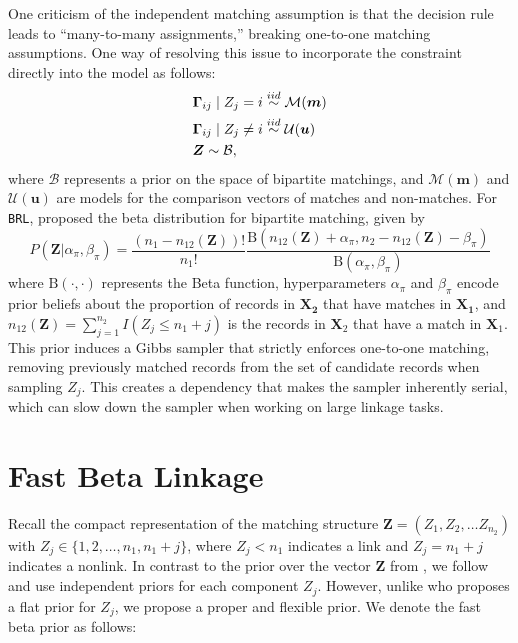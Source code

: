 \documentclass[ba]{imsart}
\begin{document}
One criticism of the independent matching assumption is that the decision rule leads to ``many-to-many assignments,'' breaking one-to-one matching assumptions. One way of resolving this issue to incorporate the constraint directly into the model as follows:
\begin{align}
	&\bm{\Gamma}_{ij} \mid Z_j =i \stackrel{iid}{\sim} \mathcal{M}(\bm{m})  \\
	&\bm{\Gamma}_{ij} \mid Z_j \neq i \stackrel{iid}{\sim} \mathcal{U}(\bm{u}) \notag \\
	& \bm{Z} \sim \mathcal{B}, \notag
\end{align}
where $\mathcal{B}$ represents a prior on the space of bipartite matchings, and $\mathcal{M}(\bm{m})$ and $\mathcal{U}(\bm{u})$ are models for the comparison vectors of matches and non-matches. For \texttt{BRL}, \cite{sadinle_bayesian_2017} proposed the beta distribution for bipartite matching, given by
$$P(\bm{Z}|\alpha_{\pi}, \beta_{\pi}) = \frac{(n_1 - n_{12}(\bm{Z}))!}{n_1 !}\frac{\text{B}(n_{12}(\bm{Z}) + \alpha_{\pi}, n_2 - n_{12}(\bm{Z}) - \beta_{\pi})}{\text{B}(\alpha_{\pi}, \beta_{\pi})}
$$
where $\text{B}(\cdot, \cdot)$ represents the Beta function, hyperparameters $\alpha_{\pi}$ and $\beta_{\pi}$ encode prior beliefs about the proportion of records in $\bm{X_2}$ that have matches in $\bm{X_1}$, and $n_{12}(\bm{Z}) = \sum_{j=1}^{n_2} I(Z_j \leq n_1 + j)$ is the records in $\bm{X}_2$ that have a match in $\bm{X}_1$. This prior induces a Gibbs sampler that strictly enforces one-to-one matching, removing previously matched records from the set of candidate records when sampling \(Z_j\). This creates a dependency that makes the sampler inherently serial, which can slow down the sampler when working on large linkage tasks.

\section{Fast Beta Linkage}
\label{sec:fast-beta-linkage}

Recall the compact representation of the matching structure $\bm{Z} = (Z_1, Z_2, \ldots Z_{n_2})$ with $Z_j \in \{1,2, \ldots, n_1, n_1 + j\}$, where $Z_j < n_1$ indicates a link and $Z_j = n_1 + j$ indicates a nonlink. In contrast to the prior over the vector $\bm{Z}$ from \cite{sadinle_bayesian_2017}, we follow \cite{wortman2019} and use independent priors for each component $Z_j$. However, unlike \cite{wortman2019} who proposes a flat prior for $Z_j$, we propose a proper and flexible prior. We denote the fast beta prior as follows:
\end{document}
